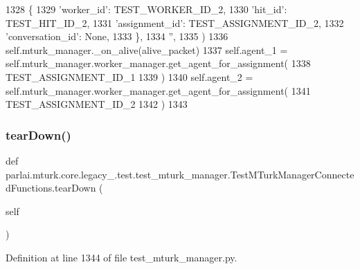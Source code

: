 \begin{DoxyCode}
1328             \{
1329                 \textcolor{stringliteral}{'worker\_id'}: TEST\_WORKER\_ID\_2,
1330                 \textcolor{stringliteral}{'hit\_id'}: TEST\_HIT\_ID\_2,
1331                 \textcolor{stringliteral}{'assignment\_id'}: TEST\_ASSIGNMENT\_ID\_2,
1332                 \textcolor{stringliteral}{'conversation\_id'}: \textcolor{keywordtype}{None},
1333             \},
1334             \textcolor{stringliteral}{''},
1335         )
1336         self.mturk\_manager.\_on\_alive(alive\_packet)
1337         self.agent\_1 = self.mturk\_manager.worker\_manager.get\_agent\_for\_assignment(
1338             TEST\_ASSIGNMENT\_ID\_1
1339         )
1340         self.agent\_2 = self.mturk\_manager.worker\_manager.get\_agent\_for\_assignment(
1341             TEST\_ASSIGNMENT\_ID\_2
1342         )
1343 
\end{DoxyCode}
\mbox{\label{classparlai_1_1mturk_1_1core_1_1legacy__2018_1_1test_1_1test__mturk__manager_1_1TestMTurkManagerConnectedFunctions_a0ea75dbb6f4d88c45eea479cb3828ed1}} 
\subsubsection{\texorpdfstring{tear\+Down()}{tearDown()}}
{\footnotesize\ttfamily def parlai.\+mturk.\+core.\+legacy\+\_.\+test.\+test\+\_\+mturk\+\_\+manager.\+Test\+M\+Turk\+Manager\+Connected\+Functions.\+tear\+Down (\begin{DoxyParamCaption}\item[{}]{self }\end{DoxyParamCaption})}



Definition at line 1344 of file test\+\_\+mturk\+\_\+manager.\+py.


